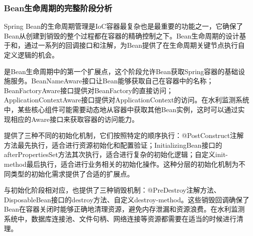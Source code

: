\hypertarget{beanux751fux547dux5468ux671fux7684ux5b8cux6574ux9636ux6bb5ux5206ux6790}{%
\subsubsection{Bean生命周期的完整阶段分析}\label{beanux751fux547dux5468ux671fux7684ux5b8cux6574ux9636ux6bb5ux5206ux6790}}

Spring Bean的生命周期管理是IoC容器最复杂也是最重要的功能之一，它确保了Bean从创建到销毁的整个过程都在容器的精确控制之下。Bean生命周期的设计基于和，通过一系列的回调接口和注解，为Bean提供了在生命周期关键节点执行自定义逻辑的机会。

是Bean生命周期中的第一个扩展点，这个阶段允许Bean获取Spring容器的基础设施服务。BeanNameAware接口让Bean能够获取自己在容器中的名称；BeanFactoryAware接口提供对BeanFactory的直接访问；ApplicationContextAware接口提供对ApplicationContext的访问。在水利监测系统中，某些核心组件可能需要动态地从容器中获取其他Bean实例，这时可以通过实现相应的Aware接口来获取容器的访问能力。

提供了三种不同的初始化机制，它们按照特定的顺序执行：@PostConstruct注解方法最先执行，适合进行资源初始化和配置验证；InitializingBean接口的afterPropertiesSet方法其次执行，适合进行复杂的初始化逻辑；自定义init-method最后执行，适合进行业务相关的初始化操作。这种分层的初始化机制为不同类型的初始化需求提供了合适的扩展点。

与初始化阶段相对应，也提供了三种销毁机制：@PreDestroy注解方法、DisposableBean接口的destroy方法、自定义destroy-method。这些销毁回调确保了Bean在容器关闭时能够正确地清理资源，避免内存泄漏和资源浪费。在水利监测系统中，数据库连接池、文件句柄、网络连接等资源都需要在适当的时候进行清理。

